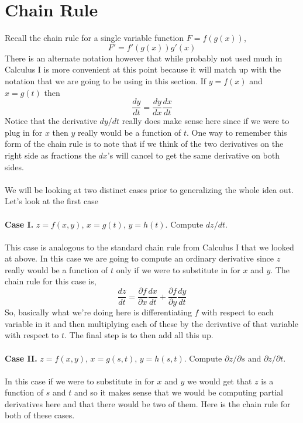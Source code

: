 \documentclass[10pt,reqno]{book}
\theoremstyle{definition}
\begin{document}
	\section{Chain Rule}
	 	
	Recall the chain rule for a single variable function $ F = f(g(x)) $,
	\[ F' = f'(g(x)) g'(x) \]
	There is an alternate notation however that while probably not used much in Calculus I is more convenient at this point because it will match up with the notation that we are going to be using in this section. If $ y = f(x) $ and $ x = g(t) $ then
	\[ \frac{dy}{dt} = \frac{dy}{dx} \frac{dx}{dt} \]
	Notice that the derivative $ dy/dt $ really does make sense here since if we were to plug in for $ x $ then $ y $ really would be a function of $ t $. One way to remember this form of the chain rule is to note that if we think of the two derivatives on the right side as fractions the $ dx $'s will cancel to get the same derivative on both sides.\\ \\
	We will be looking at two distinct cases prior to generalizing the whole idea out. Let's look at the first case\\ \\
	\textbf{Case I.} $ z = f(x,y) $, $ x = g(t) $, $ y= h(t) $. Compute $ dz/dt $.\\ \\
	This case is analogous to the standard chain rule from Calculus I that we looked at above. In this case we are going to compute an ordinary derivative since $ z $ really would be a function of $ t $ only if we were to substitute in for $ x $ and $ y $. The chain rule for this case is, 
	\[ \frac{dz}{dt} = \frac{\partial f}{\partial x} \frac{dx}{dt} + \frac{\partial f}{\partial y} \frac{dy}{dt} \]
	So, basically what we're doing here is differentiating $ f $ with respect to each variable in it and then multiplying each of these by the derivative of that variable with respect to $ t $. The final step is to then add all this up.\\ \\ 
	\textbf{Case II.} $ z = f(x,y) $, $ x = g(s,t) $, $ y = h(s,t) $. Compute $ \partial z / \partial s $ and $ \partial z / \partial t $.\\ \\
	In this case if we were to substitute in for $ x $ and $ y $ we would get that $ z $ is a function of $ s $ and $ t $ and so it makes sense that we would be computing partial derivatives here and that there would be two of them. Here is the chain rule for both of these cases.
\end{document}
